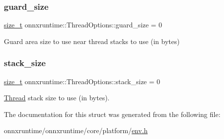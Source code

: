 \subsubsection{\texorpdfstring{guard\+\_\+size}{guard\_size}}
{\footnotesize\ttfamily \mbox{\hyperlink{mlasi_8h_a503efbc1c6e50825320ad909366b78ab}{size\+\_\+t}} onnxruntime\+::\+Thread\+Options\+::guard\+\_\+size = 0}



Guard area size to use near thread stacks to use (in bytes) 

\mbox{\label{structonnxruntime_1_1ThreadOptions_ac8c2f806d6b39622c5535e83814c7dc0}} 
\subsubsection{\texorpdfstring{stack\+\_\+size}{stack\_size}}
{\footnotesize\ttfamily \mbox{\hyperlink{mlasi_8h_a503efbc1c6e50825320ad909366b78ab}{size\+\_\+t}} onnxruntime\+::\+Thread\+Options\+::stack\+\_\+size = 0}



\mbox{\hyperlink{classonnxruntime_1_1Thread}{Thread}} stack size to use (in bytes). 



The documentation for this struct was generated from the following file\+:\begin{DoxyCompactItemize}
\item 
onnxruntime/onnxruntime/core/platform/\mbox{\hyperlink{env_8h}{env.\+h}}\end{DoxyCompactItemize}
